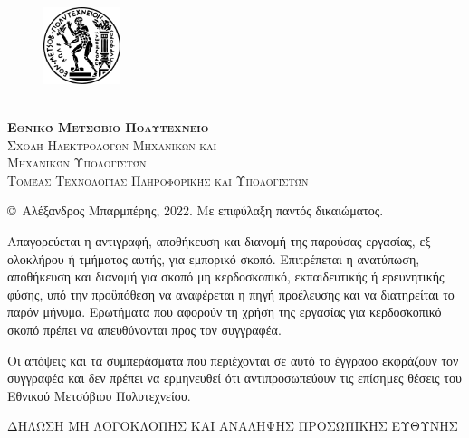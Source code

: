 \thispagestyle{empty}    
\newpage
\vspace*{-1cm}

\begingroup
    \setlength{\intextsep}{0pt}
    \setlength{\columnsep}{20pt}
    
    \begin{figure}
    \centering
    \includegraphics[width=0.2\textwidth]{images/logo/pyrforos.eps}
    
    \end{figure}
    \phantom{}\\[-7pt] %
    \LARGE{\textsc{\textbf{Εθνικό Μετσόβιο Πολυτεχνείο}}}\\[5pt]
    \Large{\textsc{Σχολή Ηλεκτρολόγων Μηχανικών
    και\\ Μηχανικών Υπολογιστών}}\\[5pt]
    \Large{\textsc{Τομέας Τεχνολογίας Πληροφορικής και Υπολογιστών}}

\endgroup

\vspace{1.5cm}
\small
\noindent
{} \copyright\ Αλέξανδρος Μπαρμπέρης, 2022. 
Με επιφύλαξη παντός δικαιώματος. 
\par
\vspace{0.6cm}
\noindent
Απαγορεύεται η αντιγραφή, αποθήκευση και διανομή της παρούσας εργασίας, εξ
ολοκλήρου ή τμήματος αυτής, για εμπορικό σκοπό. Επιτρέπεται η ανατύπωση,
αποθήκευση και διανομή για σκοπό μη κερδοσκοπικό, εκπαιδευτικής ή ερευνητικής
φύσης, υπό την προϋπόθεση να αναφέρεται η πηγή προέλευσης και να διατηρείται το
παρόν μήνυμα. Ερωτήματα που αφορούν τη χρήση της εργασίας για κερδοσκοπικό σκοπό
πρέπει να απευθύνονται προς τον συγγραφέα.
\par
\noindent
Οι απόψεις και τα συμπεράσματα που περιέχονται σε αυτό το έγγραφο εκφράζουν τον
συγγραφέα και δεν πρέπει να ερμηνευθεί ότι αντιπροσωπεύουν τις επίσημες θέσεις
του Εθνικού Μετσόβιου Πολυτεχνείου.
\par
\vspace{1.0cm}
\noindent
\begin{center}
\normalsize{ΔΗΛΩΣΗ ΜΗ ΛΟΓΟΚΛΟΠΗΣ ΚΑΙ ΑΝΑΛΗΨΗΣ ΠΡΟΣΩΠΙΚΗΣ ΕΥΘΥΝΗΣ}\hfill
\end{center}
\par
\small
\vspace{0.1cm}

